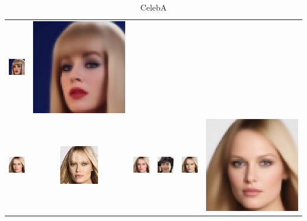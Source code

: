 \begin{table}[h!]
{\begin{tabular}{cccccc}
        \includegraphics[width=.145\textwidth]{chapter4/figures/images/celebA/diffusion_decoder_beta_0/10.png} &
        \includegraphics[width=.145\textwidth]{chapter4/figures/images/celebA/VAE_reconstruction/10.png} \\
        \includegraphics[width=.145\textwidth]{chapter4/figures/images/celebA/original/11.png} &   
        \includegraphics[width=.145\textwidth]{chapter4/figures/images/celebA/reconstruction/11.png} &
        \includegraphics[width=.145\textwidth]{chapter4/figures/images/celebA/corrected_reconstruction/11.png} &
        \includegraphics[width=.145\textwidth]{chapter4/figures/images/celebA/diffusion_decoder_beta_0.01/11.png} &
        \includegraphics[width=.145\textwidth]{chapter4/figures/images/celebA/diffusion_decoder_beta_0/11.png} &
        \includegraphics[width=.145\textwidth]{chapter4/figures/images/celebA/VAE_reconstruction/11.png} \\
    \end{tabular}}
    \caption{CelebA}
    \label{ch4:fig:extended_celebA_qualitative_comparison}
\end{table}